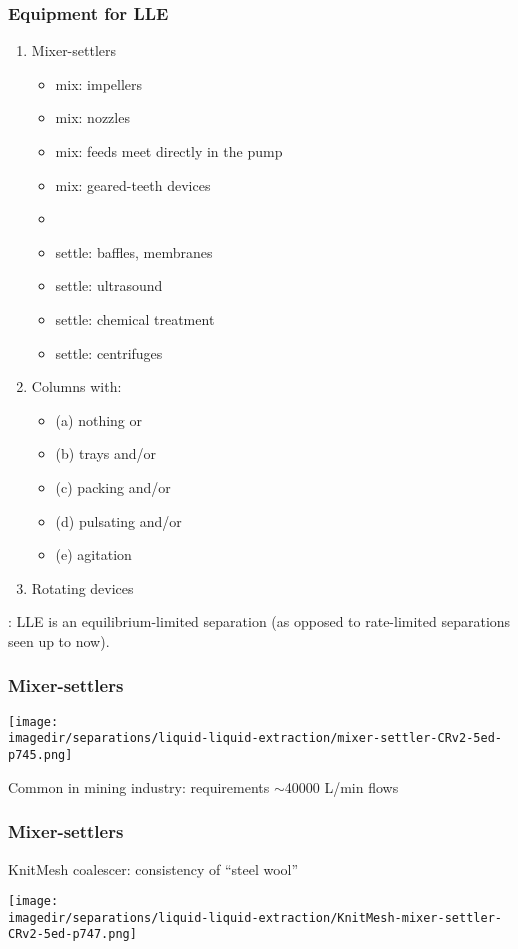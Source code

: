 \begin{frame}\frametitle{Equipment for LLE}	
	\begin{enumerate}
		\item	Mixer-settlers
		\begin{itemize}
			\item	mix: impellers
			\item	mix: nozzles
			\item	mix: feeds meet directly in the pump
			\item	mix: geared-teeth devices
			\item	{\color{myOrange}{main aim: good contact; avoid droplets smaller than 2 \micron}}
			\item	settle: baffles, membranes
			\item	settle: ultrasound
			\item	settle: chemical treatment
			\item	settle: centrifuges
		\end{itemize}
		\item	Columns with:
			\begin{itemize}
				\item	(a) nothing or
				\item	(b) trays and/or
				\item	(c) packing and/or
				\item	(d) pulsating and/or
				\item	(e) agitation
			\end{itemize}
		\item	Rotating devices
	\end{enumerate}
	{\color{myRed}{Important point}}: LLE is an equilibrium-limited separation (as opposed to rate-limited separations seen up to now).
\end{frame}

\begin{frame}\frametitle{Mixer-settlers}
	\begin{center}
		\texttt{[image: \\imagedir/separations/liquid-liquid-extraction/mixer-settler-CRv2-5ed-p745.png]}
	\end{center}
	Common in mining industry: requirements $\sim$40000 L/min flows
\end{frame}

\begin{frame}\frametitle{Mixer-settlers}
	KnitMesh coalescer: consistency of ``steel wool''
	\begin{center}
		\texttt{[image: \\imagedir/separations/liquid-liquid-extraction/KnitMesh-mixer-settler-CRv2-5ed-p747.png]}
	\end{center}
\end{frame}


